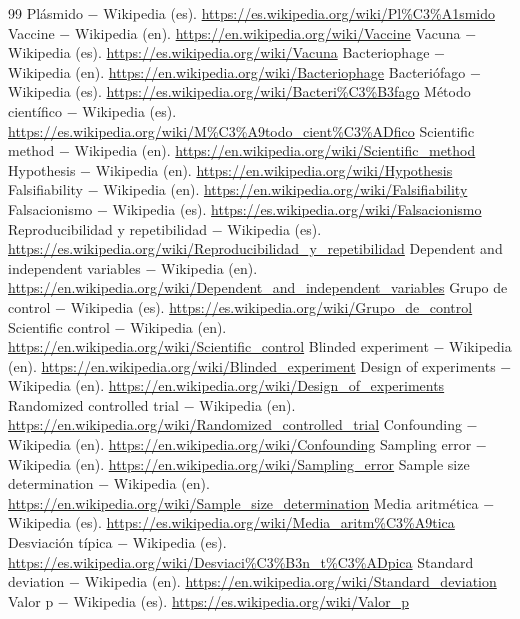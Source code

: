 \documentclass{book}
\begin{document}
\begin{thebibliography}{99}
 Plásmido \(-\) Wikipedia (es). \url{https://es.wikipedia.org/wiki/Pl%C3%A1smido}
 Vaccine \(-\) Wikipedia (en). \url{https://en.wikipedia.org/wiki/Vaccine}
 Vacuna \(-\) Wikipedia (es). \url{https://es.wikipedia.org/wiki/Vacuna}
 Bacteriophage \(-\) Wikipedia (en). \url{https://en.wikipedia.org/wiki/Bacteriophage}
 Bacteriófago \(-\) Wikipedia (es). \url{https://es.wikipedia.org/wiki/Bacteri%C3%B3fago}
 Método científico \(-\) Wikipedia (es). \url{https://es.wikipedia.org/wiki/M%C3%A9todo_cient%C3%ADfico}
 Scientific method \(-\) Wikipedia (en). \url{https://en.wikipedia.org/wiki/Scientific_method}
 Hypothesis \(-\) Wikipedia (en). \url{https://en.wikipedia.org/wiki/Hypothesis}
 Falsifiability \(-\) Wikipedia (en). \url{https://en.wikipedia.org/wiki/Falsifiability}
 Falsacionismo \(-\) Wikipedia (es). \url{https://es.wikipedia.org/wiki/Falsacionismo}
 Reproducibilidad y repetibilidad \(-\) Wikipedia (es). \url{https://es.wikipedia.org/wiki/Reproducibilidad_y_repetibilidad}
 Dependent and independent variables \(-\) Wikipedia (en). \url{https://en.wikipedia.org/wiki/Dependent_and_independent_variables}
 Grupo de control \(-\) Wikipedia (es). \url{https://es.wikipedia.org/wiki/Grupo_de_control}
 Scientific control \(-\) Wikipedia (en). \url{https://en.wikipedia.org/wiki/Scientific_control}
 Blinded experiment \(-\) Wikipedia (en). \url{https://en.wikipedia.org/wiki/Blinded_experiment}
 Design of experiments \(-\) Wikipedia (en). \url{https://en.wikipedia.org/wiki/Design_of_experiments}
 Randomized controlled trial \(-\) Wikipedia (en). \url{https://en.wikipedia.org/wiki/Randomized_controlled_trial}
 Confounding \(-\) Wikipedia (en). \url{https://en.wikipedia.org/wiki/Confounding}
 Sampling error \(-\) Wikipedia (en). \url{https://en.wikipedia.org/wiki/Sampling_error}
 Sample size determination \(-\) Wikipedia (en). \url{https://en.wikipedia.org/wiki/Sample_size_determination}
 Media aritmética \(-\) Wikipedia (es). \url{https://es.wikipedia.org/wiki/Media_aritm%C3%A9tica}
 Desviación típica \(-\) Wikipedia (es). \url{https://es.wikipedia.org/wiki/Desviaci%C3%B3n_t%C3%ADpica}
 Standard deviation \(-\) Wikipedia (en). \url{https://en.wikipedia.org/wiki/Standard_deviation}
 Valor p \(-\) Wikipedia (es). \url{https://es.wikipedia.org/wiki/Valor_p}

\end{thebibliography}
\end{document}
